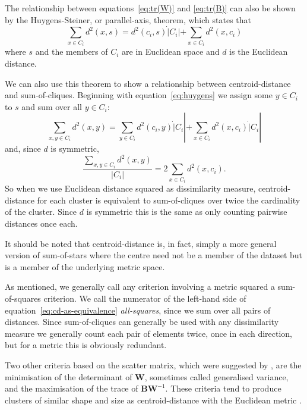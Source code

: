 \documentclass[a4paper]{report}
\begin{document}
The relationship between equations~\eqref{eq:tr(W)} and \eqref{eq:tr(B)} can
also be shown by the Huygens-Steiner, or parallel-axis, theorem, which states
that
\begin{equation}
  \label{eq:huygens}
  \sum_{x \in C_i} d^2(x,s) = d^2(c_i,s) \dot |C_i| + \sum_{x \in C_i} d^2(x,c_i)
\end{equation}
where $s$ and the members of $C_i$ are in Euclidean space and $d$ is the
Euclidean distance.

We can also use this theorem to show a relationship between centroid-distance
and sum-of-cliques.  Beginning with equation~\eqref{eq:huygens} we assign some
$y \in C_i$ to $s$ and sum over all $y \in C_i$:
\begin{equation*}
  \sum_{x,y \in C_i} d^2(x,y) = \sum_{y \in C_i} d^2(c_i,y) \dot |C_i|
                           + \sum_{x \in C_i} d^2(x,c_i) \dot |C_i|
\end{equation*}
and, since $d$ is symmetric,
\begin{equation}
  \label{eq:cd-as-equivalence}
  \frac{\displaystyle \sum_{x,y \in C_i} d^2(x,y)}
       {|C_i|}
  = 2 \sum_{x \in C_i} d^2(x,c_i).
\end{equation}
So when we use Euclidean distance squared as dissimilarity measure,
centroid-distance for each cluster is equivalent to sum-of-cliques over twice
the cardinality of the cluster.  Since $d$ is symmetric this is the same as
only counting pairwise distances once each.

It should be noted that centroid-distance is, in fact, simply a more general
version of sum-of-stars where the centre need not be a member of the dataset
but is a member of the underlying metric space.

As mentioned, we generally call any criterion involving a metric squared a
sum-of-squares criterion.  We call the numerator of the left-hand side of
equation~\eqref{eq:cd-as-equivalence} \textit{all-squares}, since we sum over
all pairs of distances.  Since sum-of-cliques can generally be used with any
dissimilarity measure we generally count each pair of elements twice, once in
each direction, but for a metric this is obviously redundant.

Two other criteria based on the scatter matrix, which were suggested by
\citet{friedman1967criteria}, are the minimisation of the determinant of
$\mathbf{W}$, sometimes called generalised variance, and the maximisation of
the trace of $\mathbf{BW}^{-1}$.  These criteria tend to produce clusters of
similar shape and size as centroid-distance with the Euclidean metric
\citep{marriott1982optimization}.
\end{document}
